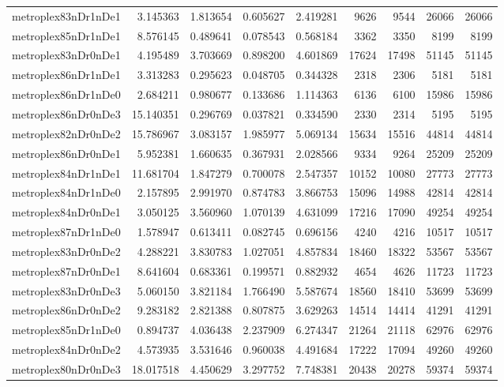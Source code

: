 \begin{longtable}{|l|r|r|r|r|r|r|r|r|}
metroplex83nDr1nDe1 & 3.145363 & 1.813654 & 0.605627 & 2.419281 & 9626 & 9544 & 26066 & 26066 \\
metroplex85nDr1nDe1 & 8.576145 & 0.489641 & 0.078543 & 0.568184 & 3362 & 3350 & 8199 & 8199 \\
metroplex83nDr0nDe1 & 4.195489 & 3.703669 & 0.898200 & 4.601869 & 17624 & 17498 & 51145 & 51145 \\
metroplex86nDr1nDe1 & 3.313283 & 0.295623 & 0.048705 & 0.344328 & 2318 & 2306 & 5181 & 5181 \\
metroplex86nDr1nDe0 & 2.684211 & 0.980677 & 0.133686 & 1.114363 & 6136 & 6100 & 15986 & 15986 \\
metroplex86nDr0nDe3 & 15.140351 & 0.296769 & 0.037821 & 0.334590 & 2330 & 2314 & 5195 & 5195 \\
metroplex82nDr0nDe2 & 15.786967 & 3.083157 & 1.985977 & 5.069134 & 15634 & 15516 & 44814 & 44814 \\
metroplex86nDr0nDe1 & 5.952381 & 1.660635 & 0.367931 & 2.028566 & 9334 & 9264 & 25209 & 25209 \\
metroplex84nDr1nDe1 & 11.681704 & 1.847279 & 0.700078 & 2.547357 & 10152 & 10080 & 27773 & 27773 \\
metroplex84nDr1nDe0 & 2.157895 & 2.991970 & 0.874783 & 3.866753 & 15096 & 14988 & 42814 & 42814 \\
metroplex84nDr0nDe1 & 3.050125 & 3.560960 & 1.070139 & 4.631099 & 17216 & 17090 & 49254 & 49254 \\
metroplex87nDr1nDe0 & 1.578947 & 0.613411 & 0.082745 & 0.696156 & 4240 & 4216 & 10517 & 10517 \\
metroplex83nDr0nDe2 & 4.288221 & 3.830783 & 1.027051 & 4.857834 & 18460 & 18322 & 53567 & 53567 \\
metroplex87nDr0nDe1 & 8.641604 & 0.683361 & 0.199571 & 0.882932 & 4654 & 4626 & 11723 & 11723 \\
metroplex83nDr0nDe3 & 5.060150 & 3.821184 & 1.766490 & 5.587674 & 18560 & 18410 & 53699 & 53699 \\
metroplex86nDr0nDe2 & 9.283182 & 2.821388 & 0.807875 & 3.629263 & 14514 & 14414 & 41291 & 41291 \\
metroplex85nDr1nDe0 & 0.894737 & 4.036438 & 2.237909 & 6.274347 & 21264 & 21118 & 62976 & 62976 \\
metroplex84nDr0nDe2 & 4.573935 & 3.531646 & 0.960038 & 4.491684 & 17222 & 17094 & 49260 & 49260 \\
metroplex80nDr0nDe3 & 18.017518 & 4.450629 & 3.297752 & 7.748381 & 20438 & 20278 & 59374 & 59374 \\

\end{longtable}
